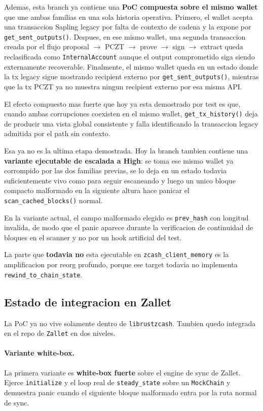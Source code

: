 \documentclass[11pt,a4paper]{article}
\begin{document}
Ademas, esta branch ya contiene una \textbf{PoC compuesta sobre el mismo
wallet} que une ambas familias en una sola historia operativa. Primero, el
wallet acepta una transaccion Sapling legacy por falta de contexto de cadena y
la expone por \texttt{get\_sent\_outputs()}. Despues, en ese mismo wallet, una
segunda transaccion creada por el flujo
proposal $\rightarrow$ PCZT $\rightarrow$ prove $\rightarrow$ sign
$\rightarrow$ extract queda reclasificada como \texttt{InternalAccount}
aunque el output comprometido siga siendo externamente recoverable. Finalmente,
el mismo wallet queda en un estado donde la tx legacy sigue mostrando
recipient externo por \texttt{get\_sent\_outputs()}, mientras que la tx PCZT
ya no muestra ningun recipient externo por esa misma API.

El efecto compuesto mas fuerte que hoy ya esta demostrado por test es que,
cuando ambas corrupciones coexisten en el mismo wallet, \texttt{get\_tx\_history()}
deja de producir una vista global consistente y falla identificando la
transaccion legacy admitida por el path sin contexto.

Esa ya no es la ultima etapa demostrada. Hoy la branch tambien contiene una
\textbf{variante ejecutable de escalada a High}: se toma ese mismo wallet ya
corrompido por las dos familias previas, se lo deja en un estado todavia
suficientemente vivo como para seguir escaneando y luego un unico bloque
compacto malformado en la siguiente altura hace panicar el
\texttt{scan\_cached\_blocks()} normal.

En la variante actual, el campo malformado elegido es \texttt{prev\_hash} con
longitud invalida, de modo que el panic aparece durante la verificacion de
continuidad de bloques en el scanner y no por un hook artificial del test.

La parte que \textbf{todavia no} esta ejecutable en
\texttt{zcash\_client\_memory} es la amplificacion por reorg profundo, porque
ese target todavia no implementa \texttt{rewind\_to\_chain\_state}.

\subsection{Estado de integracion en Zallet}

La PoC ya no vive solamente dentro de \texttt{librustzcash}. Tambien quedo
integrada en el repo de \texttt{Zallet} en dos niveles.

\paragraph{Variante white-box.}
La primera variante es \textbf{white-box fuerte} sobre el engine de sync de
Zallet. Ejerce \texttt{initialize} y el loop real de \texttt{steady\_state}
sobre un \texttt{MockChain} y demuestra panic cuando el siguiente bloque
malformado entra por la ruta normal de sync.
\end{document}
